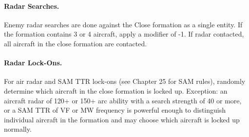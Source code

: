 \begin{advancedrules}
{\paragraph{Radar Searches.} Enemy radar searches are done against the Close formation as a single entity. If the formation contains 3 or 4 aircraft, apply a modifier of -1. If radar contacted, all aircraft in the close formation are contacted.

\paragraph{Radar Lock-Ons.} For air radar and SAM TTR lock-ons (see Chapter 25 for SAM rules), randomly determine which aircraft in the close formation is locked up. Exception: an aircraft radar of 120+ or 150+ arc ability with a search strength of 40 or more, or a SAM TTR of VF or MW frequency is powerful enough to distinguish individual aircraft in the formation and may choose which aircraft is locked up normally.
}

\end{advancedrules}
